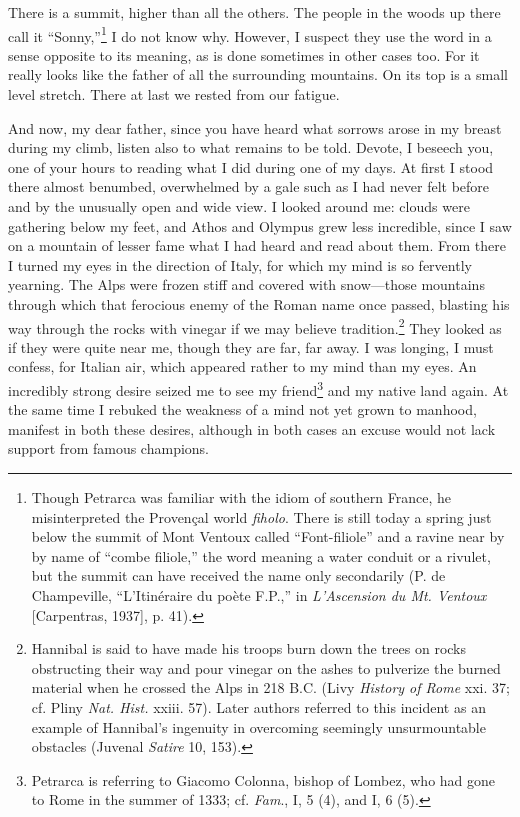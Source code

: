 There is a summit, higher than all the others. The people in the woods
up there call it ``Sonny,''\footnote{Though Petrarca was familiar with
the idiom of southern France, he misinterpreted the Proven\c{c}al
world \textit{fiholo}. There is still today a spring just below the
summit of Mont Ventoux called ``Font-filiole'' and a ravine near by by
name of ``combe filiole,'' the word meaning a water conduit or a
rivulet, but the summit can have received the name only secondarily
(P. de Champeville, ``L'Itin\'{e}raire du po\`{e}te F.P.,'' in
\textit{L'Ascension du Mt. Ventoux} [Carpentras, 1937], p. 41).} I do
not know why. However, I suspect they use the word in a sense opposite
to its meaning, as is done sometimes in other cases too. For it really
looks like the father of all the surrounding mountains. On its top is
a small level stretch. There at last we rested from our fatigue.

And now, my dear father, since you have heard what sorrows arose in my
breast during my climb, listen also to what remains to be told.
Devote, I beseech you, one of your hours to reading what I did during
one of my days. At first I stood there almost benumbed, overwhelmed by
a gale such as I had never felt before and by the unusually open and
wide view. I looked around me: clouds were gathering below my feet,
and Athos and Olympus grew less incredible, since I saw on a mountain
of lesser fame what I had heard and read about them. From there I
turned my eyes in the direction of Italy, for which my mind is so
fervently yearning. The Alps were frozen stiff and covered with
snow---those mountains through which that ferocious enemy of the Roman
name once passed, blasting his way through the rocks with vinegar if
we may believe tradition.\footnote{Hannibal is said to have made his
troops burn down the trees on rocks obstructing their way and pour
vinegar on the ashes to pulverize the burned material when he crossed
the Alps in 218 \textsc{B.C.} (Livy \textit{History of Rome} xxi. 37;
cf. Pliny \textit{Nat. Hist.} xxiii. 57). Later authors referred to
this incident as an example of Hannibal's ingenuity in overcoming
seemingly unsurmountable obstacles (Juvenal \textit{Satire} 10, 153).}
They looked as if they were quite near me, though they are far, far
away. I was longing, I must confess, for Italian air,  which
appeared rather to my mind than my eyes. An incredibly strong desire
seized me to see my friend\footnote{Petrarca is referring to Giacomo
Colonna, bishop of Lombez, who had gone to Rome in the summer of 1333;
cf. \textit{Fam}., I, 5 (4), and I, 6 (5).} and my native land again.
At the same time I rebuked the weakness of a mind not yet grown to
manhood, manifest in both these desires, although in both cases an
excuse would not lack support from famous champions.

